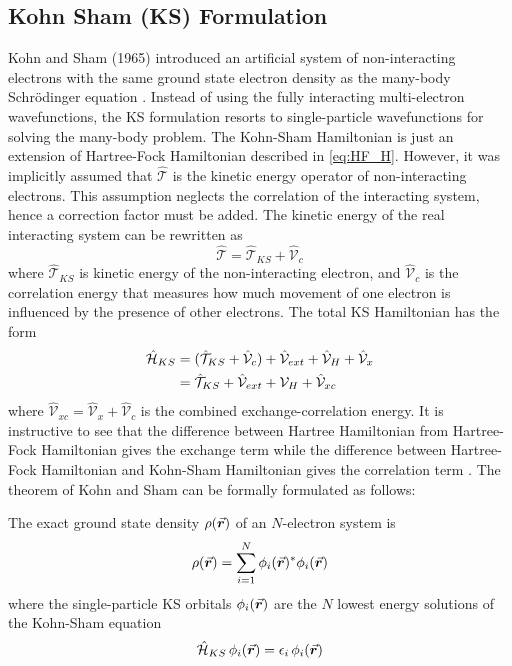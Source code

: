 \subsection{Kohn Sham (KS) Formulation}
Kohn and Sham (1965) introduced an artificial system of non-interacting electrons with the same ground state electron density as the many-body Schr\"{o}dinger equation \citep{Kohn1965}. Instead of using the fully interacting multi-electron wavefunctions, the KS formulation resorts to single-particle wavefunctions for solving the many-body problem. The Kohn-Sham Hamiltonian is just an extension of Hartree-Fock Hamiltonian described in \eqref{eq:HF_H}. However, it was implicitly assumed that $\hat{\mathcal{T}}$ is the  kinetic energy operator of non-interacting electrons. This assumption neglects the correlation of the interacting system, hence a correction factor must be added. The kinetic energy of the real interacting system can be rewritten as
\begin{equation}
	\hat{\mathcal{T}} = \hat{\mathcal{T}}_{KS} +  \hat{\mathcal{V}}_c
\end{equation}
where $\hat{\mathcal{T}}_{KS}$ is kinetic energy of the non-interacting electron, and $\hat{\mathcal{V}}_c$ is the correlation energy that measures how much movement of one electron is influenced by the presence of other electrons. The total KS Hamiltonian has the form
\begin{align} \label{eq:HF_H}
	\hat{\mathcal{H}}_{KS} & = (\hat{\mathcal{T}}_{KS} +  \hat{\mathcal{V}}_c)  + \hat{\mathcal{V}}_{ext} + \hat{\mathcal{V}}_H + \hat{\mathcal{V}}_x \notag \\
	                       & = \hat{\mathcal{T}}_{KS} + \hat{\mathcal{V}}_{ext} +{\mathcal{V}}_H + \hat{\mathcal{V}}_{xc}
\end{align}
where $\hat{\mathcal{V}}_{xc} = \hat{\mathcal{V}}_{x} + \hat{\mathcal{V}}_{c}$ is the combined exchange-correlation energy.  It is instructive to see that the difference between Hartree Hamiltonian from Hartree-Fock Hamiltonian gives the exchange term while the difference between Hartree-Fock Hamiltonian and Kohn-Sham Hamiltonian gives the correlation term \citep{Cottenier2002}. The theorem of Kohn and Sham can be formally formulated as follows:

The exact ground state density $\rho({\va*{r}})$ of an $N$-electron system is
\begin{equation} \label{eq:charge_dens}
	\rho({\va*{r}}) = \sum_{i=1}^N \phi_i(\va*{r})^* \phi_i(\va*{r})
\end{equation}
where the single-particle KS orbitals $\phi_i(\va*{r})$ are the $N$ lowest energy solutions of the Kohn-Sham equation
\begin{equation}\label{eq:KS}
	\hat{\mathcal{H}}_{KS}\, \phi_i(\va*{r}) = \epsilon_i\, \phi_i(\va*{r})
\end{equation}
